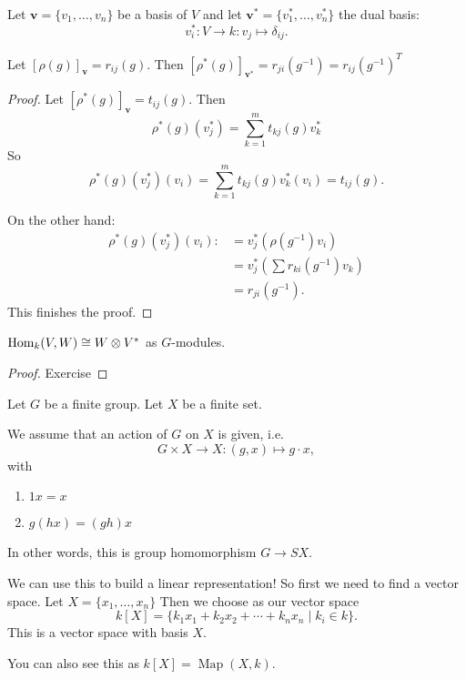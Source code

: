 Let $\mathbf{v} = \{ v_1, \ldots, v_n\} $ be a basis of $V$ and let $\mathbf{v}^{*} = \{v_1^{*}, \ldots, v_n^{*}\} $ the dual basis:
\[
v_i^{*} : V \to  k : v_j \mapsto \delta_{ij}
.\] 

Let $[\rho(g)]_{\mathbf{v}} = r_{ij}(g)$.
Then $[\rho^{*}(g)]_{\mathbf{v}^{*}} = r_{ji}(g^{-1}) = r_{ij}(g^{-1})^{T}$

\begin{proof}
    Let $[\rho^{*}(g)]_{\mathbf{v}} = t_{ij}(g)$.
    Then
    \[
        \rho^{*}(g)(v^{*}_j) = \sum_{k=1}^{m} t_{kj}(g) v_k^{*}
    \]
    So
    \[
        \rho^{*}(g)(v_j^{*})(v_i) = \sum_{k=1}^{m} t_{kj}(g) v_k^{*}(v_i) = t_{ij}(g)
    .\] 

    On the other hand:
    \begin{align*}
        \rho^{*}(g)(v_j^*)(v_i) :&= v_j^* ( \rho(g^{-1}) v_i )\\
                                 &= v_j^* (\sum r_{ki}(g^{-1}) v_k)\\
                                 &= r_{ji}(g^{-1})
    .\end{align*} 
    This finishes the proof.
\end{proof}

\begin{prop}
    $\operatorname{Hom}_{k}(V, W) \cong W \otimes V^*$ as $G$-modules.
\end{prop}
\begin{proof}
    Exercise
\end{proof}


Let $G$ be a finite group.
Let $X$ be a finite set. 

We assume that an action of $G$ on $X$ is given, i.e.
\[G \times  X \to  X: (g, x) \mapsto  g\cdot x,\]
with
\begin{enumerate}[(1)]
    \item $1x = x$
    \item $g(hx) = (gh) x$
\end{enumerate}

In other words, this is group homomorphism $G \to  SX$.

We can use this to build a linear representation!
So first we need to find a vector space.
Let $X = \{x_1, \ldots, x_n\} $
Then we choose as our vector space
\[
    k[X] = \{k_1 x_1 + k_2 x_2 + \cdots + k_n x_n  \mid  k_i \in k\} 
.\] 
This is a vector space with basis $X$.

\begin{remark}
    You can also see this as $k[X] = \operatorname{Map}(X, k)$.
\end{remark}

